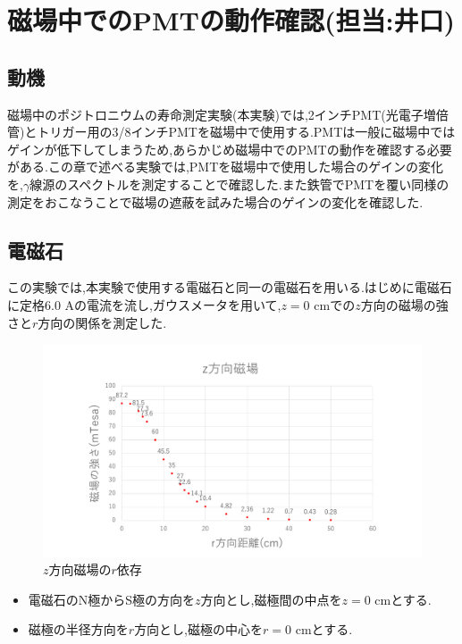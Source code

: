 \chapter{磁場中でのPMTの動作確認(担当:井口)}\label{PMT}

\section{動機}
磁場中のポジトロニウムの寿命測定実験(本実験)では,2インチPMT(光電子増倍管)とトリガー用の3/8インチPMTを磁場中で使用する.PMTは一般に磁場中ではゲインが低下してしまうため,あらかじめ磁場中でのPMTの動作を確認する必要がある.この章で述べる実験では,PMTを磁場中で使用した場合のゲインの変化を,$\gamma$線源のスペクトルを測定することで確認した.また鉄管でPMTを覆い同様の測定をおこなうことで磁場の遮蔽を試みた場合のゲインの変化を確認した.


\section{電磁石}
この実験では,本実験で使用する電磁石と同一の電磁石を用いる.はじめに電磁石に定格6.0 Aの電流を流し,ガウスメータを用いて,$z=0$ cmでの$z$方向の磁場の強さと$r$方向の関係を測定した.

\begin{figure}[h]
	\centering
	\includegraphics[width=15cm]{fig/iguchi/maggraph01.pdf}
	\caption{$z$方向磁場の$r$依存}
	\label{maggraph01}
\end{figure}

\newpage
\begin{itemize}
       \item 電磁石のN極からS極の方向を$z$方向とし,磁極間の中点を$z=0$ cmとする.
       \item 磁極の半径方向を$r$方向とし,磁極の中心を$r=0$ cmとする.
\end{itemize}


